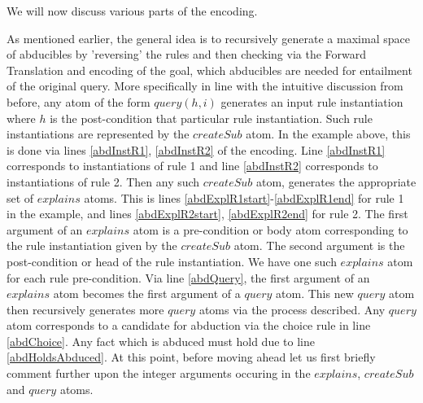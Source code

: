 We will now discuss various parts of the encoding.

As mentioned earlier, the general idea is to recursively generate a
maximal space of abducibles by 'reversing' the rules and then checking via the
Forward Translation and encoding of the goal, which abducibles are needed
for entailment of the original query.  
More specifically in line with the intuitive discussion from before, any atom
of the form $query(h,i)$ generates an input rule instantiation where $h$ is
the post-condition that particular rule instantiation. Such rule
instantiations are represented by the $createSub$ atom. In the example above,
this is done via lines \ref{abdInstR1}, \ref{abdInstR2} of the encoding. Line \ref{abdInstR1} corresponds to
instantiations of rule 1 and line \ref{abdInstR2} corresponds to instantiations of rule
2. Then any such $createSub$ atom, generates the appropriate set of $explains$
atoms. This is lines \ref{abdExplR1start}-\ref{abdExplR1end} for rule 1 in the example, and lines \ref{abdExplR2start}, \ref{abdExplR2end} for
rule 2. The first argument of an $explains$ atom is a pre-condition or body
atom corresponding to the rule instantiation given by the $createSub$
atom. The second argument is the post-condition or head of the rule
instantiation. We have one such $explains$ atom for each rule
pre-condition. Via line \ref{abdQuery}, the first argument of an $explains$ atom becomes
the first argument of a $query$ atom. This new $query$ atom then recursively
generates more $query$ atoms via the process described. Any $query$ atom
corresponds to a candidate for abduction via the choice rule in line \ref{abdChoice}. Any
fact which is abduced must hold due to line \ref{abdHoldsAbduced}. At this point, before moving
ahead let us first briefly comment further upon the integer arguments occuring in the
$explains$, $createSub$ and $query$ atoms.

